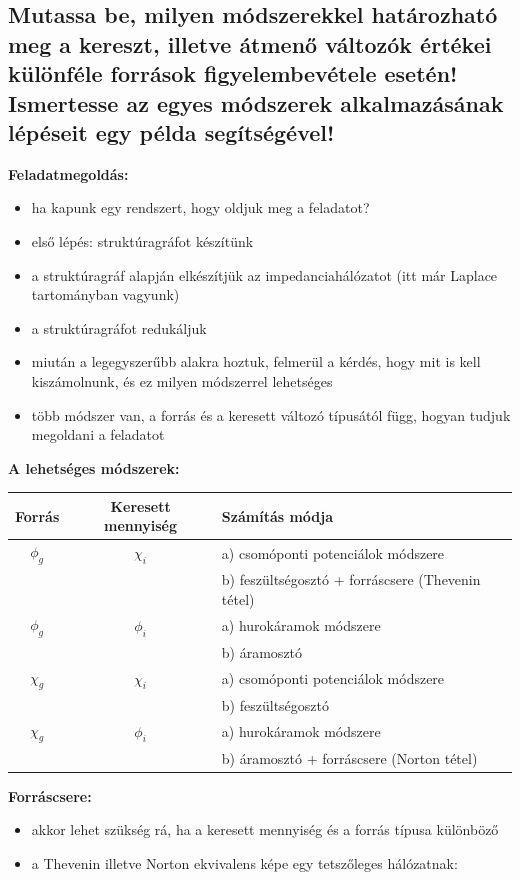 \subsection{Mutassa be, milyen módszerekkel határozható meg a kereszt, illetve átmenő változók értékei különféle források figyelembevétele esetén! Ismertesse az egyes módszerek alkalmazásának lépéseit egy példa segítségével!}

\noindent \textbf{Feladatmegoldás:}
\begin{itemize}
    \item ha kapunk egy rendszert, hogy oldjuk meg a feladatot?
    \item első lépés: struktúragráfot készítünk
    \item a struktúragráf alapján elkészítjük az impedanciahálózatot (itt már Laplace tartományban vagyunk)
    \item a struktúragráfot redukáljuk
    \item miután a legegyszerűbb alakra hoztuk, felmerül a kérdés, hogy mit is kell kiszámolnunk, és ez milyen módszerrel lehetséges
    \item több módszer van, a forrás és a keresett változó típusától függ, hogyan tudjuk megoldani a feladatot
\end{itemize}

\noindent \textbf{A lehetséges módszerek:}
\begin{table}[H]
    \centering
    \begin{tabular}{|c|c|l|}
        \hline
        Forrás & Keresett mennyiség & Számítás módja \\ \hline
        $\phi_g$ & $\chi_i$ & a) csomóponti potenciálok módszere \\
        & & b) feszültségosztó + forráscsere (Thevenin tétel) \\ \hline
        $\phi_g$ & $\phi_i$ & a) hurokáramok módszere \\
        & & b) áramosztó \\ \hline
        $\chi_g$ & $\chi_i$ & a) csomóponti potenciálok módszere \\
        & & b) feszültségosztó \\ \hline
        $\chi_g$ & $\phi_i$ & a) hurokáramok módszere \\
        & & b) áramosztó + forráscsere (Norton tétel) \\ \hline
    \end{tabular}
\end{table}

\noindent \textbf{Forráscsere:}
\begin{itemize}
    \item akkor lehet szükség rá, ha a keresett mennyiség és a forrás típusa különböző
    \item a Thevenin illetve Norton ekvivalens képe egy tetszőleges hálózatnak:
\end{itemize}

